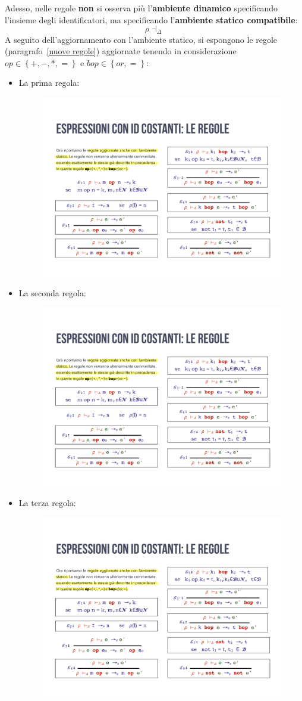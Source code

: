 \documentclass[a4paper]{article}
\begin{document}
	\noindent
	Adesso, nelle regole \textbf{non} si osserva più l'\textbf{ambiente dinamico} specificando l'insieme degli identificatori, ma specificando l'\textbf{ambiente statico compatibile}:
	\begin{equation*}
		\rho \dashv_{\Delta}
	\end{equation*}
	A seguito dell'aggiornamento con l'ambiente statico, si espongono le regole (paragrafo~\ref{nuove regole}) aggiornate tenendo in considerazione $op \in \left\{+,-,*,=\right\}$ e $bop \in \left\{or,=\right\}$:
	\begin{itemize}
		\item La prima regola:
		\begin{figure}[!htp]
			\centering
			\includegraphics[width=.6\textwidth]{img/regola_espressione-mod-1.pdf}
		\end{figure}
		
		\item La seconda regola:
		\begin{figure}[!htp]
			\centering
			\includegraphics[width=.6\textwidth]{img/regola_espressione-mod-2.pdf}
		\end{figure}\newpage
		
		\item La terza regola:
		\begin{figure}[!htp]
			\centering
			\includegraphics[width=.6\textwidth]{img/regola_espressione-mod-3.pdf}
		\end{figure}
		

\end{itemize}
\end{document}
